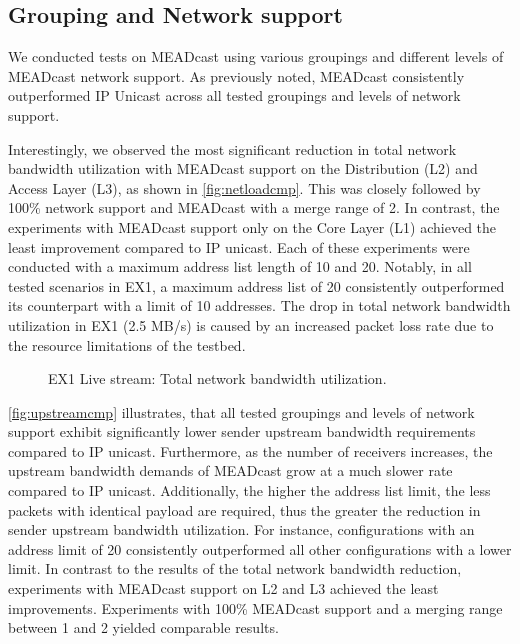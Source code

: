 \subsection{Grouping and Network support} %
\label{sub:Results_Grouping and Network support}

We conducted tests on MEADcast using various groupings and different levels of
    MEADcast network support.
As previously noted, MEADcast consistently outperformed IP Unicast across all
    tested groupings and levels of network support.

Interestingly, we observed the most significant reduction in total network
    bandwidth utilization with MEADcast support on the Distribution (L2) and
    Access Layer (L3), as shown in \autoref{fig:netloadcmp}.
This was closely followed by 100\% network support and MEADcast with a merge 
    range of 2.
In contrast, the experiments with MEADcast support only on the Core Layer (L1)
    achieved the least improvement compared to IP unicast.
Each of these experiments were conducted with a maximum address list length of
    10 and 20.
Notably, in all tested scenarios in EX1, a maximum address list of 20
    consistently outperformed its counterpart with a limit of 10 addresses.
The drop in total network bandwidth utilization in EX1 (2.5 MB/s) is caused by
    an increased packet loss rate due to the resource limitations of the
    testbed.

\begin{figure}
    \begin{center}
        
    \end{center}
    \caption[EX1 Live stream: Total network bandwidth utilization]{
        EX1 Live stream: Total network bandwidth utilization.}
    \label{fig:netloadcmp}
\end{figure}

\autoref{fig:upstreamcmp} illustrates, that all tested groupings and levels of
    network support exhibit significantly lower sender upstream bandwidth
    requirements compared to IP unicast.
Furthermore, as the number of receivers increases, the upstream bandwidth
    demands of MEADcast grow at a much slower rate compared to IP unicast.
Additionally, the higher the address list limit, the less packets with
    identical payload are required, thus the greater the reduction in sender
    upstream bandwidth utilization.
For instance, configurations with an address limit of 20 consistently
    outperformed all other configurations with a lower limit.
In contrast to the results of the total network bandwidth reduction,
    experiments with MEADcast support on L2 and L3 achieved the least
    improvements.
Experiments with 100\% MEADcast support and a merging range between 1 and 2
    yielded comparable results.

